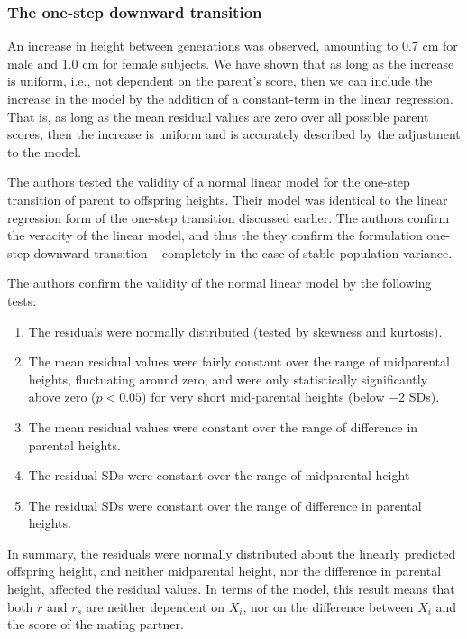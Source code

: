 \documentclass[letterpaper,10pt]{article} %
\begin{document}
\subsubsection*{The one-step downward transition}

An increase in height between generations was observed, amounting to 0.7 cm for male and 1.0 cm for female subjects. We have shown that as long as the increase is uniform, i.e., not dependent on the parent's score, then we can include the increase in the model by the addition of a constant-term in the linear regression. That is, as long as the mean residual values are zero over all possible parent scores, then the increase is uniform and is accurately described by the adjustment to the model.

The authors tested the validity of a normal linear model for the one-step transition of parent to offspring heights. Their model was identical to the linear regression form of the one-step transition discussed earlier. The authors confirm the veracity of the linear model, and thus the they confirm the formulation one-step downward transition -- completely in the case of stable population variance.

The authors confirm the validity of the normal linear model by the following tests:
\begin{enumerate}
\item The residuals were normally distributed (tested by skewness and kurtosis).
\item The mean residual values were fairly constant over the range of midparental heights, fluctuating around zero, and were only statistically significantly above zero ($p < 0.05$) for very short mid-parental heights (below $-2$ SDs).
\item The mean residual values were constant over the range of difference in parental heights.
\item The residual SDs were constant over the range of midparental height  
\item The residual SDs were constant over the range of difference in parental heights.
\end{enumerate}

In summary, the residuals were normally distributed about the linearly predicted offspring height, and neither midparental height, nor the difference in parental height, affected the residual values. In terms of the model, this result means that both $r$ and $r_s$ are neither dependent on $X_i$, nor on the difference between $X_i$ and the score of the mating partner. 
\end{document}
